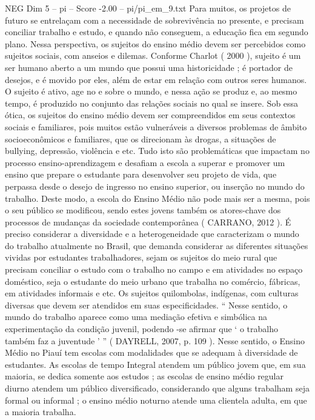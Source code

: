 \begin{textsample}{NEG Dim 5 – pi – Score -2.00 – pi/pi\_em\_9.txt}
Para muitos, os projetos de futuro se entrelaçam com a necessidade de sobrevivência no presente, e precisam conciliar trabalho e estudo, e quando não conseguem, a educação fica em segundo plano.
Nessa perspectiva, os sujeitos do ensino médio devem ser percebidos como sujeitos sociais, com anseios e dilemas.
Conforme Charlot ( 2000 ), sujeito é um ser humano aberto a um mundo que possui uma historicidade ; é portador de desejos, e é movido por eles, além de estar em relação com outros seres humanos.
O sujeito é ativo, age no e sobre o mundo, e nessa ação se produz e, ao mesmo tempo, é produzido no conjunto das relações sociais no qual se insere.
Sob essa ótica, os sujeitos do ensino médio devem ser compreendidos em seus contextos sociais e familiares, pois muitos estão vulneráveis a diversos problemas de âmbito socioeconômicos e familiares, que os direcionam às drogas, a situações de bullying, depressão, violência e etc.
Tudo isto são problemáticas que impactam no processo ensino-aprendizagem e desafiam a escola a superar e promover um ensino que prepare o estudante para desenvolver seu projeto de vida, que perpassa desde o desejo de ingresso no ensino superior, ou inserção no mundo do trabalho.
Deste modo, a escola do Ensino Médio não pode mais ser a mesma, pois o seu público se modificou, sendo estes jovens também os atores-chave dos processos de mudanças da sociedade contemporânea ( CARRANO, 2012 ).
É preciso considerar a diversidade e a heterogeneidade que caracterizam o mundo do trabalho atualmente no Brasil, que demanda considerar as diferentes situações vividas por estudantes trabalhadores, sejam os sujeitos do meio rural que precisam conciliar o estudo com o trabalho no campo e em atividades no espaço doméstico, seja o estudante do meio urbano que trabalha no comércio, fábricas, em atividades informais e etc.
Os sujeitos quilombolas, indígenas, com culturas diversas que devem ser atendidos em suas especificidades. “ Nesse sentido, o mundo do trabalho aparece como uma mediação efetiva e simbólica na experimentação da condição juvenil, podendo -se afirmar que ‘ o trabalho também faz a juventude ’ ” ( DAYRELL, 2007, p. 109 ).
Nesse sentido, o Ensino Médio no Piauí tem escolas com modalidades que se adequam à diversidade de estudantes.
As escolas de tempo Integral atendem um público jovem que, em sua maioria, se dedica somente aos estudos ; as escolas de ensino médio regular diurno atendem um público diversificado, considerando que alguns trabalham seja formal ou informal ; o ensino médio noturno atende uma clientela adulta, em que a maioria trabalha.

\end{textsample}
